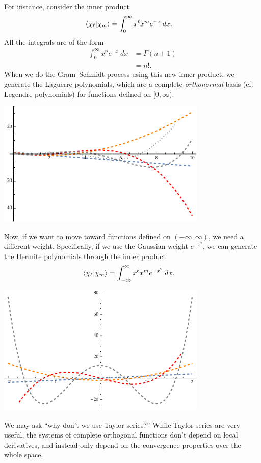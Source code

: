 \documentclass[10pt]{mypackage}
\begin{document}
For instance, consider the inner product
\begin{align*}
  \braket{\chi_{\ell}}{\chi_{m}} &= \int_{0}^{\infty} x^{\ell}x^{m}e^{-x}\:dx.
\end{align*}
All the integrals are of the form
\begin{align*}
  \int_{0}^{\infty} x^{n}e^{-x}\:dx &= \Gamma\left(n+1\right)\\
                                    &= n!.
\end{align*}
When we do the Gram--Schmidt process using this new inner product, we generate the Laguerre polynomials, which are a complete \textit{orthonormal} basis (cf. Legendre polynomials) for functions defined on $[0,\infty)$.
\begin{center}
  \includegraphics[width=10cm]{images/laguerre_polynomials.pdf}
\end{center}
Now, if we want to move toward functions defined on $\left(-\infty,\infty\right)$, we need a different weight. Specifically, if we use the Gaussian weight $e^{-x^2}$, we can generate the Hermite polynomials through the inner product
\begin{align*}
  \braket{\chi_\ell}{\chi_m} &= \int_{-\infty}^{\infty} x^{\ell}x^{m}e^{-x^2}\:dx.
\end{align*}
\begin{center}
  \includegraphics[width=10cm]{images/hermite_polynomials.pdf}
\end{center}
We may ask ``why don't we use Taylor series?'' While Taylor series are very useful, the systems of complete orthogonal functions don't depend on local derivatives, and instead only depend on the convergence properties over the whole space.
\end{document}
